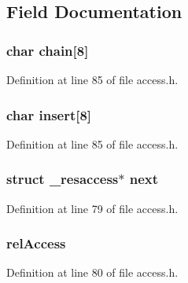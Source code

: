 \subsection{Field Documentation}
\hypertarget{struct__resaccess_a1e471e3ec9c79ebce4ec2e64d506ba8f}{
\subsubsection[{chain}]{\setlength{\rightskip}{0pt plus 5cm}char chain\mbox{[}8\mbox{]}}}\label{struct__resaccess_a1e471e3ec9c79ebce4ec2e64d506ba8f}


Definition at line 85 of file access.\-h.

\hypertarget{struct__resaccess_a8cc72faf0908e6fff29637c614e608ed}{
\subsubsection[{insert}]{\setlength{\rightskip}{0pt plus 5cm}char insert\mbox{[}8\mbox{]}}}\label{struct__resaccess_a8cc72faf0908e6fff29637c614e608ed}


Definition at line 85 of file access.\-h.

\hypertarget{struct__resaccess_a295e27ff72673a8dbd47cc051ed0a77a}{
\subsubsection[{next}]{\setlength{\rightskip}{0pt plus 5cm}struct {\bf \-\_\-resaccess}$\ast$ next}}\label{struct__resaccess_a295e27ff72673a8dbd47cc051ed0a77a}


Definition at line 79 of file access.\-h.

\hypertarget{struct__resaccess_a5b73edb2c84c56943d41dc814b7e7909}{
\subsubsection[{rel\-Access}]{ rel\-Access}}\label{struct__resaccess_a5b73edb2c84c56943d41dc814b7e7909}


Definition at line 80 of file access.\-h.

